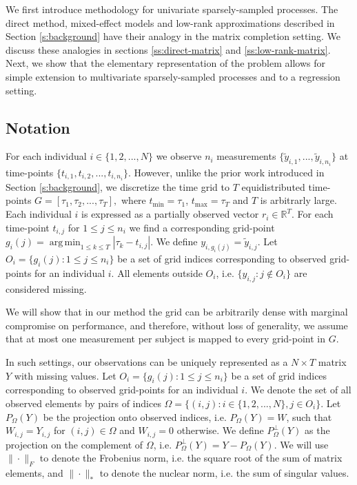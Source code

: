 \documentclass[preprint]{imsart}
\numberwithin{equation}{section}
\theoremstyle{plain}
\newcommand{\R}{\mathbb{R}}
\DeclareMathOperator*{\argmin}{arg\,min}
\begin{document}
We first introduce methodology for univariate sparsely-sampled processes. The direct method, mixed-effect models and low-rank approximations described in Section \ref{s:background} have their analogy in the matrix completion setting. We discuss these analogies in sections \ref{ss:direct-matrix} and \ref{ss:low-rank-matrix}. Next, we show that the elementary representation of the problem allows for simple extension to multivariate sparsely-sampled processes and to a regression setting.

\subsection{Notation}

For each individual $i \in \{1,2,...,N\}$ we observe $n_i$ measurements $\{\tilde y_{i,1},...,\tilde y_{i,n_i}\}$ at time-points $\{t_{i,1},t_{i,2},...,t_{i,n_i}\}$. However, unlike the prior work introduced in Section \ref{s:background}, we discretize the time grid to $T$ equidistributed time-points $G = \left[\tau_1, \tau_2, ..., \tau_T\right],$ where $t_{\min} = \tau_1$, $t_{\max} = \tau_T$ and $T$ is arbitrarly large. Each individual $i$ is expressed as a partially observed vector $r_i \in \R^T$. For each time-point $t_{i,j}$ for $1 \leq j \leq n_i$ we find a corresponding grid-point $g_i(j) = \argmin_{1 \leq k \leq T}  |\tau_k - t_{i,j}|$. We define $y_{i,g_i(j)} = \tilde y_{i,j}$. Let $O_i = \{g_i(j): 1 \leq j \leq n_i \}$ be a set of grid indices corresponding to observed grid-points for an individual $i$. All elements outside $O_i$, i.e. $\{y_{i,j} : j \notin O_i\}$ are considered missing.

We will show that in our method the grid can be arbitrarily dense with marginal compromise on performance, and therefore, without loss of generality, we assume that at most one measurement per subject is mapped to every grid-point in $G$.

In such settings, our observations can be uniquely represented as a $N \times T$ matrix $Y$ with missing values. Let $O_i = \{g_i(j): 1 \leq j \leq n_i \}$ be a set of grid indices corresponding to observed grid-points for an individual $i$. We denote the set of all observed elements by pairs of indices $\Omega = \{ (i,j) : i\in \{1,2,...,N\}, j \in O_i \}$. Let $P_\Omega(Y)$ be the projection onto observed indices, i.e. $P_\Omega(Y) = W$, such that $W_{i,j} = Y_{i,j}$ for $(i,j) \in \Omega$ and $W_{i,j} = 0$ otherwise. We define $P^\perp_\Omega(Y)$ as the projection on the complement of $\Omega$, i.e. $P^\perp_\Omega(Y) = Y - P_\Omega(Y)$. We will use $\|\cdot\|_F$ to denote the Frobenius norm, i.e. the square root of the sum of matrix elements, and $\|\cdot\|_*$ to denote the nuclear norm, i.e. the sum of singular values.
\end{document}
